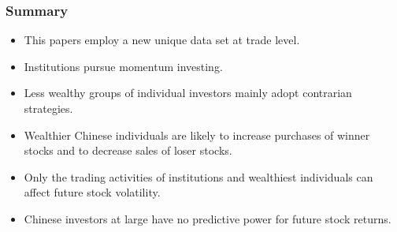 \documentclass{beamer}
\begin{document}
\begin{frame}
    \frametitle{Summary}
    \begin{itemize}
        \item This papers employ a new unique data set at trade level.
        \item Institutions pursue momentum investing.
        \item Less wealthy groups of individual investors mainly adopt contrarian strategies.
        \item Wealthier Chinese individuals are likely to increase purchases of winner stocks and to decrease sales of loser stocks.
        \item Only the trading activities of institutions and wealthiest individuals can aﬀect future stock volatility.
        \item Chinese investors at large have no predictive power for future stock returns.
    \end{itemize}
\end{frame}
\end{document}
